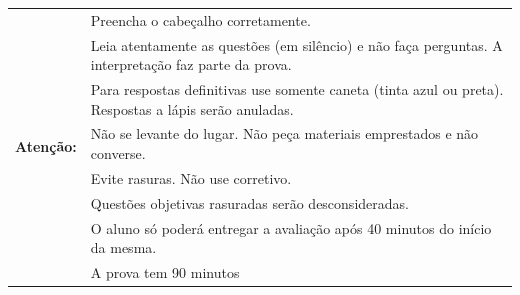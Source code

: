 \documentclass[a4paper,12,addpoints]{exam}
\newcommand{\timelimit}{90 minutos}
\begin{document}
\begin{table}[h!]	
	\begin{tabularx}{20cm}{cX}
		\cline{1-2}
		\multirow{8}{*}{\textbf{Atenção:}} & {Preencha o cabeçalho corretamente.} \\
		& {Leia atentamente as questões (em silêncio) e não faça perguntas. A interpretação faz parte da prova.}  \\
		& {Para respostas definitivas use somente caneta (tinta azul ou preta). Respostas a lápis serão anuladas.} \\
		& {Não se levante do lugar. Não peça materiais emprestados e não converse.} \\
		& {Evite rasuras. Não use corretivo.} \\
		& {Questões objetivas rasuradas serão desconsideradas.} \\
		& {O aluno só poderá entregar a avaliação após 40 minutos do início da mesma.} \\
		&A prova tem \timelimit\\\cline{1-2}
	\end{tabularx}
\end{table}
\end{document}
